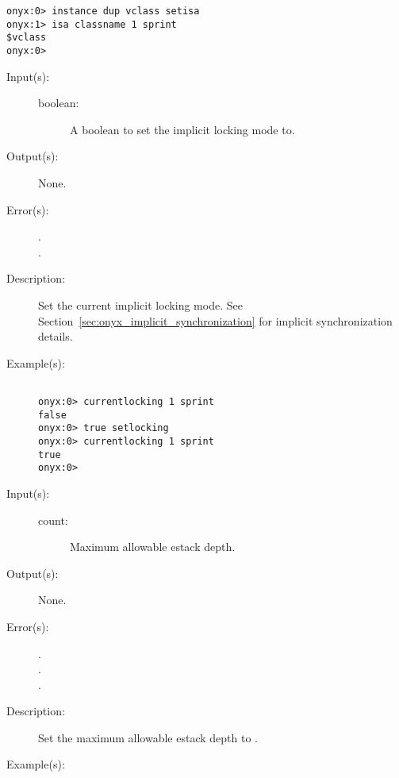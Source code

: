\begin{description}
\begin{description}
\begin{verbatim}
onyx:0> instance dup vclass setisa
onyx:1> isa classname 1 sprint
$vclass
onyx:0>
		\end{verbatim}
	\end{description}
\label{systemdict:setlocking}
\item[{\onyxop{boolean}{setlocking}{--}}: ]
	\begin{description}\item[]
	\item[Input(s): ]
		\begin{description}\item[]
		\item[boolean: ]
			A boolean to set the implicit locking mode to.
		\end{description}
	\item[Output(s): ] None.
	\item[Error(s): ]
		\begin{description}\item[]
		\item[.]
		\item[.]
		\end{description}
	\item[Description: ]
		Set the current implicit locking mode.  See
		Section~\ref{sec:onyx_implicit_synchronization} for implicit
		synchronization details.
	\item[Example(s): ]\begin{verbatim}

onyx:0> currentlocking 1 sprint
false
onyx:0> true setlocking
onyx:0> currentlocking 1 sprint
true
onyx:0>
		\end{verbatim}
	\end{description}
\label{systemdict:setmaxestack}
\item[{\onyxop{count}{setmaxestack}{--}}: ]
	\begin{description}\item[]
	\item[Input(s): ]
		\begin{description}\item[]
		\item[count: ]
			Maximum allowable estack depth.
		\end{description}
	\item[Output(s): ] None.
	\item[Error(s): ]
		\begin{description}\item[]
		\item[.]
		\item[.]
		\item[.]
		\end{description}
	\item[Description: ]
		Set the maximum allowable estack depth to .
	\item[Example(s): ]\begin{verbatim}


\end{verbatim}
\end{description}
\end{description}

